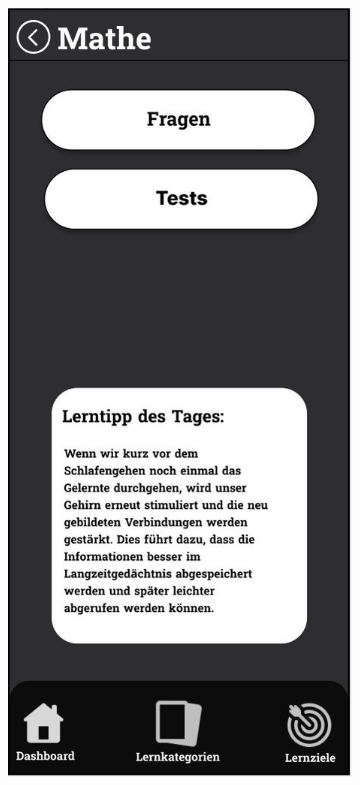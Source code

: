 \newpage

\begin{figure}[htbp]
  \centering
  \begin{subfigure}[b]{0.45\linewidth}
    \centering
    \includegraphics[width=\linewidth]{images/Mockups/FragenTests.JPG}

\end{subfigure}
\end{figure}
